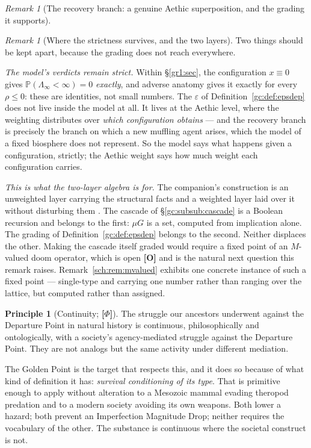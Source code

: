 \documentclass[11pt]{article}
\numberwithin{equation}{section}
\theoremstyle{plain}
\theoremstyle{definition}
\newtheorem{principle}{Principle}
\theoremstyle{remark}
\newtheorem{remark}[theorem]{Remark}
\newcommand{\PP}{\mathbb{P}}
\begin{document}
\begin{remark}[The recovery branch: a genuine Aethic superposition,
and the grading it supports]
\begin{remark}[Where the strictness survives, and the two layers]
\label{gc:rem:twolayers}
Two things should be kept apart, because the grading does not reach
everywhere.

\emph{The model's verdicts remain strict.} Within \S\ref{gr1:sec}, the
configuration $x\equiv0$ gives $\PP(\Lambda_\infty<\infty)=0$
\emph{exactly}, and adverse anatomy gives it exactly for every
$\rho\le0$: these are identities, not small numbers. The $\varepsilon$
of Definition~\ref{gc:def:epsdep} does not live inside the model at
all. It lives at the Aethic level, where the weighting distributes over
\emph{which configuration obtains} --- and the recovery branch is
precisely the branch on which a new muffling agent arises, which the
model of a fixed biosphere does not represent. So the model says what
happens given a configuration, strictly; the Aethic weight says how
much weight each configuration carries.

\emph{This is what the two-layer algebra is for.} The companion's
construction is an unweighted layer carrying the structural facts and a
weighted layer laid over it without disturbing them
\cite{WeightAlg}. The cascade of \S\ref{gc:subsub:cascade} is a Boolean
recursion and belongs to the first: $\mu G$ is a set, computed from
implication alone. The grading of
Definition~\ref{gc:def:epsdep} belongs to the second. Neither
displaces the other. Making the cascade itself graded would require a
fixed point of an $M$-valued doom operator, which is open \textbf{[O]}
and is the natural next question this remark raises.
Remark~\ref{sch:rem:mvalued} exhibits one concrete instance of such a
fixed point --- single-type and carrying one number rather than ranging
over the lattice, but computed rather than assigned.
\end{remark}
\end{remark}


\begin{principle}[Continuity; \textbf{[$\Phi$]}]\label{gc:prin:continuity}
The struggle our ancestors underwent against the Departure Point in
natural history is continuous, philosophically and ontologically, with a
society's agency-mediated struggle against the Departure Point. They are
not analogs but the same activity under different mediation.
\end{principle}

The Golden Point is the target that respects this, and it does so
because of what kind of definition it has: \emph{survival conditioning
of its type}. That is primitive enough to apply without alteration to a
Mesozoic mammal evading theropod predation and to a modern society
avoiding its own weapons. Both lower a hazard; both prevent an
Imperfection Magnitude Drop; neither requires the vocabulary of the
other. The substance is continuous where the societal construct is not.
\end{document}
